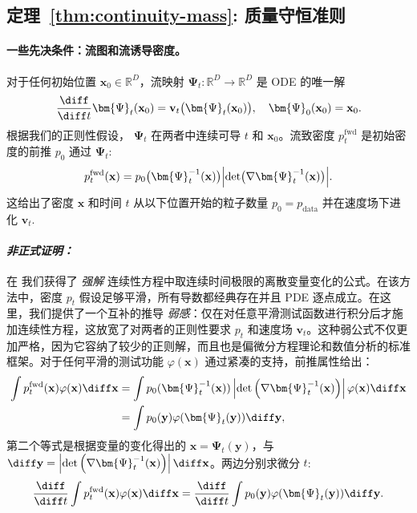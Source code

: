 \subsection{定理~\ref{thm:continuity-mass}: 质量守恒准则}\label{app-sec:mass-conservation}

\paragraph{一些先决条件：流图和流诱导密度。} 对于任何初始位置 $\mathbf{x}_0\in\mathbb{R}^D$，流映射
$\bm{\Psi}_t:\mathbb{R}^D\to\mathbb{R}^D$ 是 ODE 的唯一解
\[
\frac{\diff}{\diff t} \bm{\Psi}_t(\mathbf{x}_0)
= \mathbf{v}_t\bigl(\bm{\Psi}_t(\mathbf{x}_0)\bigr),
\quad \bm{\Psi}_0(\mathbf{x}_0)=\mathbf{x}_0.
\]
根据我们的正则性假设， $\bm{\Psi}_t$ 在两者中连续可导 $t$ 和 $\mathbf{x}_0$。流致密度 $p_t^{\mathrm{fwd}}$ 是初始密度的前推 $p_0$ 通过 $\bm{\Psi}_t$:
\[
p_t^{\mathrm{fwd}}(\mathbf{x})
= p_0\bigl(\bm{\Psi}_t^{-1}(\mathbf{x})\bigr)
  \Bigl|\det \bigl(\nabla\bm{\Psi}_t^{-1}(\mathbf{x})\bigr)\Bigr|.
\]
这给出了密度 $\mathbf{x}$ 和时间 $t$ 从以下位置开始的粒子数量 $p_0=p_{\mathrm{data}}$ 并在速度场下进化 $\mathbf{v}_t$.


\paragraph{\textit{非正式证明：}} 
在  我们获得了 \emph{强解} 连续性方程中取连续时间极限的离散变量变化的公式。在该方法中，密度 $p_t$ 假设足够平滑，所有导数都经典存在并且 PDE 逐点成立。在这里，我们提供了一个互补的推导 \emph{弱感}：仅在对任意平滑测试函数进行积分后才施加连续性方程，这放宽了对两者的正则性要求 $p_t$ 和速度场 $\mathbf{v}_t$。这种弱公式不仅更加严格，因为它容纳了较少的正则解，而且也是偏微分方程理论和数值分析的标准框架。对于任何平滑的测试功能 $ \varphi(\mathbf{x}) $ 通过紧凑的支持，前推属性给出：
\begin{align*}
    \int p_t^{\mathrm{fwd}}(\mathbf{x}) \varphi(\mathbf{x})  \diff\mathbf{x} &= \int p_0(\bm{\Psi}_t^{-1}(\mathbf{x})) \left| \det\left( \nabla \bm{\Psi}_t^{-1}(\mathbf{x}) \right) \right| \varphi(\mathbf{x}) \diff\mathbf{x}\\ &=  \int p_0(\mathbf{y}) \varphi(\bm{\Psi}_t(\mathbf{y})) \diff\mathbf{y},
\end{align*}
第二个等式是根据变量的变化得出的 $ \mathbf{x} = \bm{\Psi}_t(\mathbf{y}) $，与 $ \diff\mathbf{y} = \left| \det\left( \nabla \bm{\Psi}_t^{-1}(\mathbf{x}) \right) \right| \diff\mathbf{x} $。两边分别求微分 $ t $:
\[
\frac{\diff}{\diff t} \int p_t^{\mathrm{fwd}}(\mathbf{x}) \varphi(\mathbf{x}) \diff\mathbf{x} = \frac{\diff}{\diff t} \int p_0(\mathbf{y}) \varphi(\bm{\Psi}_t(\mathbf{y})) \diff\mathbf{y}.
\]

